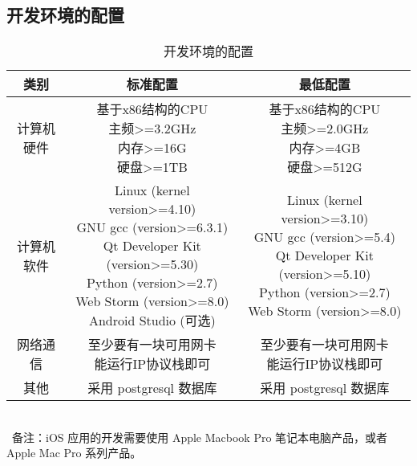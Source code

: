 \subsection{开发环境的配置}
\begin{table}[h]
\centering
\caption{开发环境的配置} \label{tab:development-environment}
\begin{tabular}{|c|c|c|}
    \hline
    类别 & 标准配置 & 最低配置 \\
    \hline
    计算机硬件 & \tabincell{c}{基于x86结构的CPU\\ 主频>=3.2GHz\\ 内存>=16G\\ 硬盘>=1TB} & \tabincell{c}{基于x86结构的CPU\\ 主频>=2.0GHz\\ 内存>=4GB\\ 硬盘>=512G} \\
    \hline
    计算机软件 & 
    \tabincell{c} {
        Linux (kernel version>=4.10)\\ 
        GNU gcc (version>=6.3.1)\\
        Qt Developer Kit (version>=5.30)\\
        Python (version>=2.7)\\
        Web Storm (version>=8.0)\\
        Android Studio (可选)\\
        } & 
    \tabincell{c} {
        Linux (kernel version>=3.10)\\ 
        GNU gcc (version>=5.4)\\
        Qt Developer Kit (version>=5.10)\\
        Python (version>=2.7)\\
        Web Storm (version>=8.0)\\
        } \\
    \hline
    网络通信 & \tabincell{c}{至少要有一块可用网卡\\ 能运行IP协议栈即可} & \tabincell{c}{至少要有一块可用网卡\\ 能运行IP协议栈即可} \\
    \hline
    其他 & 采用 postgresql 数据库 & 采用 postgresql 数据库 \\
    \hline
\end{tabular}
\raggedright
~\\~备注：iOS 应用的开发需要使用 Apple Macbook Pro 
笔记本电脑产品，或者 Apple Mac Pro 系列产品。
\end{table}

